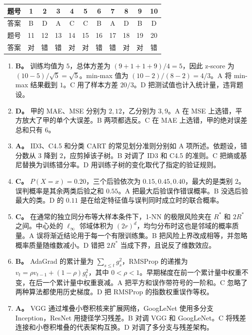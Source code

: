 \begin{center}
\begin{tabular}{c*{10}{c}}
题号 & 1 & 2 & 3 & 4 & 5 & 6 & 7 & 8 & 9 & 10\\
\hline
答案 & B & D & A & C & C & B & A & D & B & D\\[3pt]
题号 & 11 & 12 & 13 & 14 & 15 & 16 & 17 & 18 & 19 & 20\\
\hline
答案 & 对 & 错 & 错 & 对 & 对 & 错 & 错 & 对 & 对 & 错\\
\end{tabular}
\end{center}

\begin{enumerate}[label=\arabic*.]
\item \textbf{B。} 训练均值为 $5$，总体方差为 $(9+1+1+9)/4=5$，因此 z-score 为 $(10-5)/\sqrt5=\sqrt5$。min-max 值为 $(10-2)/(8-2)=4/3$。A 将 min-max 结果截到 $1$。C 用了样本方差 $20/3$。D 把测试值也计入统计量，违背题设。
\item \textbf{D。} 甲的 MAE、MSE 分别为 $2,12$，乙分别为 $3,9$。A 在 MSE 上选错，平方放大了甲的单个大误差。B 两项都选反。C 在 MAE 上选错，甲的绝对误差总和只有 $6$。
\item \textbf{A。} ID3、C4.5 和分类 CART 的常见划分准则分别如 A 项所述。依题设，错分数从 $3$ 降到 $2$，应剪掉该子树。B 对调了 ID3 和 C4.5 的准则。C 把熵或基尼替换为训练错分率。D 用训练子树的变化取代了指定的验证规则。
\item \textbf{C。} $P(X=x)=0.20$，三个后验依次为 $0.15,0.45,0.40$，最大的是类别 $2$。误判概率是其余两类后验之和 $0.55$。A 把最大后验误作错误概率。B 没选后验最大的类。D 的 $0.11$ 是在给定特征值与误判同时成立时的联合概率。
\item \textbf{C。} 在通常的独立同分布等大样本条件下，1-NN 的极限风险夹在 $R^\ast$ 和 $2R^\ast$ 之间。中心处的 $\ell_\infty$ 邻域体积为 $(2r)^d$，均匀分布时这也是邻域的概率质量。A 误将渐近结论用于每一个有限训练集。B 把风险上界改成相等，并忽略概率质量随维数减小。D 错把 $2R^\ast$ 当成下界，且说反了维数效应。
\item \textbf{B。} AdaGrad 的累计量为 $\sum_{s\le t}g_s^2$，RMSProp 的递推为 $v_t=\rho v_{t-1}+(1-\rho)g_t^2$，其中 $0<\rho<1$。早期梯度在前一个累计量中权重不变，在后一个累计量中权重衰减。A 把平方和误作带符号的一阶和。C 忽略了两种算法都使用历史梯度。D 把 RMSProp 的指数权重误作等权。
\item \textbf{A。} VGG 通过堆叠小卷积核来扩展网络，GoogLeNet 使用多分支 Inception，ResNet 用捷径学习残差。B 对调 VGG 和 GoogLeNet。C 将残差连接和小卷积堆叠的代表架构互换。D 对调了多分支与残差架构。

\end{enumerate}
